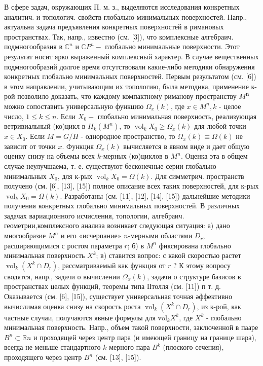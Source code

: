 \documentclass[10pt]{article}
\begin{document}
В сфере задач, окружающих П. м. з., выделяются исследования конкретных аналитич. и топологич. свойств глобально минимальных поверхностей. Напр., актуальна задача предъявления конкретных поверхностей в римановых пространствах. Так, напр., известно (см. [3]), что комплексные алгебраич. подмногообразия в $\mathbb{C}^{n}$ и $\mathbb{C} P^{n}-$ глобально минимальные поверхности. Этот результат носит ярко выраженный комплексный характер. В случае вещественных подмногообразий долгое время отсутствовали какие-либо методики обнаружения конкретных глобально минимальных поверхностей. Первым результатом (см. [6]) в этом направлении, учитывающим их топологию, была методика, применение к-рой позволило доказать, что каждому компактному риманову пространству $M^{\boldsymbol{n}}$ можно сопоставить универсальную функцию $\Omega_{x}(k)$, где $x \in M^{n}, k$ - целое число, $1 \leqslant k \leqslant n$. Если $X_{0}-$ глобально минимальная поверхность, реализующая ветривиальный (ко)цикл в $H_{k}\left(M^{n}\right)$, то $\operatorname{vol}_{k} X_{0} \geqslant \Omega_{x}(k)$ для любой точки $x \in X_{0}$. Если $M=G / H$ - однородное пространство, то $\Omega_{x}(k) \equiv \Omega(k)$ не зависит от точки $x$. Функция $\Omega_{x}(k)$ вычисляется в явном виде и дает общую оценку снизу на объемы всех $k$-мерных (ко)циклов в $M^{n}$. Оценка эта в общем случае неулучшаема, т. е. существуют бесконечные серии глобально минимальных $X_{0}$, для к-рых $\operatorname{vol}_{k} X_{0}=\Omega(k)$. Для симметрич. пространств получено (см. [6], [13], [15]) полное описание всех таких поверхностей, для к-рых $\operatorname{vol}_{k} X_{0}=\Omega(k)$. Разработаны (см. [11], [12], [14], [15]) дальнейшие методики получения конкретных глобально минимальных поверхностей. В различных задачах вариационного исчисления, топологии, алгебраич. геометрии,комплексного анализа возникает следующая ситуация: а) дано многообразие $M^{n}$ и его «исчерпание» $n$-мерными областями $D_{r}$, расширяющимися с ростом параметра $r$; б) в $M^{n}$ фиксирована глобально минимальная поверхность $X^{k}$; в) ставится вопрос: с какой скоростью растет $\operatorname{vol}_{k}\left(X^{k} \cap D_{r}\right)$, рассматриваемый как функция от $r$ ? К этому вопросу сводятся, напр., задачи о вычислении $\Omega_{x}(k)$, задачи о структуре базисов в пространствах целых функций, теоремы типа ІІтолля (см. [11]) п т. д. Оказывается (см. [6], [15]), существует универсальная точная әффективно вычислимая оценка снизу на скорость роста $\operatorname{vol}_{k}\left(X^{k} \cap D_{r}\right)$, из к-рой, как частные случаи, получаются явные формулы для $\mathrm{vol}_{k} X^{k}$, где $X^{k}$ - глобально минимальная поверхность. Напр., объем такой поверхности, заключенной в пааре $B^{n} \subset \mathbb{R} n$ и проходящей через центр пара (и имеющей границу на границе шара), всегда не меньше стандартного $k$ мерного пара $B^{k}$ (плоского сечения), проходящего через центр $B^{n}$ (см. [13], [15]).
\end{document}
